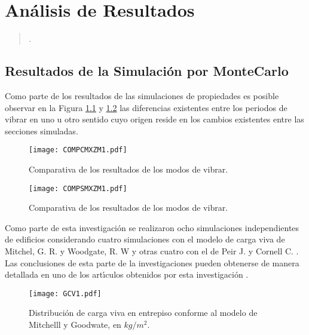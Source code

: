 
\chapter{ An\'alisis de Resultados}

\begin{flushleft}
\begin{verse}
	\emph{.}
\newline
\end{verse}
\end{flushleft}

\section{Resultados de la Simulaci\'on por MonteCarlo}

Como parte de los resultados de las simulaciones de propiedades es posible observar en la Figura \ref{fig:dim2} y \ref{fig:rf1} las diferencias existentes entre los periodos de vibrar en uno u otro sentido cuyo origen reside en los cambios existentes entre las secciones simuladas.

\begin{figure} [htbp]
\texttt{[image: COMPCMXZM1.pdf]}
\caption{Comparativa de los resultados de los modos de vibrar.}
\label{fig:dim2}
\end{figure}

\begin{figure} [htbp]
\texttt{[image: COMPSMXZM1.pdf]}
\caption{Comparativa de los resultados de los modos de vibrar.}
\label{fig:rf1}
\end{figure}

Como parte de esta investigaci\'on se realizaron ocho simulaciones independientes de edificios considerando cuatro simulaciones con el modelo de carga viva de Mitchel, G. R. y Woodgate, R. W \cite{MG1970} y otras cuatro con el de Peir J. y Cornell C. \cite{PC1973}. Las conclusiones de esta parte de la investigaciones pueden obtenerse de manera detallada en uno de los art\'{\i}culos obtenidos por esta investigaci\'on \cite{SIBCV2014}.

\begin{figure} [htbp]
\texttt{[image: GCV1.pdf]}
\caption{Distribuci\'on de carga viva en entrepiso conforme al modelo de Mitchelll y Goodwate, en $kg/m^{2}$.}
\label{fig:rf2}
\end{figure}

